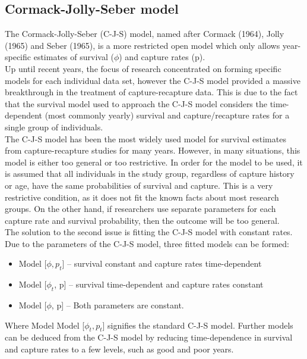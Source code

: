 \documentclass[,oneside]{article}
\numberwithin{equation}{section}
\begin{document}
\subsection{Cormack-Jolly-Seber model}
The Cormack-Jolly-Seber (C-J-S) model, named after Cormack (1964), Jolly (1965) and Seber (1965), is a more restricted open model which only allows year-specific estimates of survival ($\phi$) and capture rates (p). \cite{Ap90}\\
Up until recent years, the focus of research concentrated on forming specific models for each individual data set, however the C-J-S model provided a massive breakthrough in the treatment of capture-recapture data. \cite{Ap94} This is due to the fact that the survival model used to approach the C-J-S model considers the time-dependent (most commonly yearly) survival and capture/recapture rates for a single group of individuals.\\
The C-J-S model has been the most widely used model for survival estimates from capture-recapture studies for many years. However, in many situations, this model is either too general or too restrictive. In order for the model to be used, it is assumed that all individuals in the study group, regardless of capture history or age, have the same probabilities of survival and capture. This is a very restrictive condition, as it does not fit the known facts about most research groups. On the other hand, if researchers use separate parameters for each capture rate and survival probability, then the outcome will be too general. \cite{Ap94}\\
The solution to the second issue is fitting the C-J-S model with constant rates. Due to the parameters of the C-J-S model, three fitted models can be formed:
\begin{itemize}
\item Model [$\phi, p_t$] – survival constant and capture rates time-dependent
\item Model [$\phi_t$, p] – survival time-dependent and capture rates constant
\item Model [$\phi$, p] – Both parameters are constant.
\end{itemize}
Where Model Model [$\phi_t, p_t$] signifies the standard C-J-S model. Further models can be deduced from the C-J-S model by reducing time-dependence in survival and capture rates to a few levels, such as good and poor years. \cite{Ap94}
\end{document}
